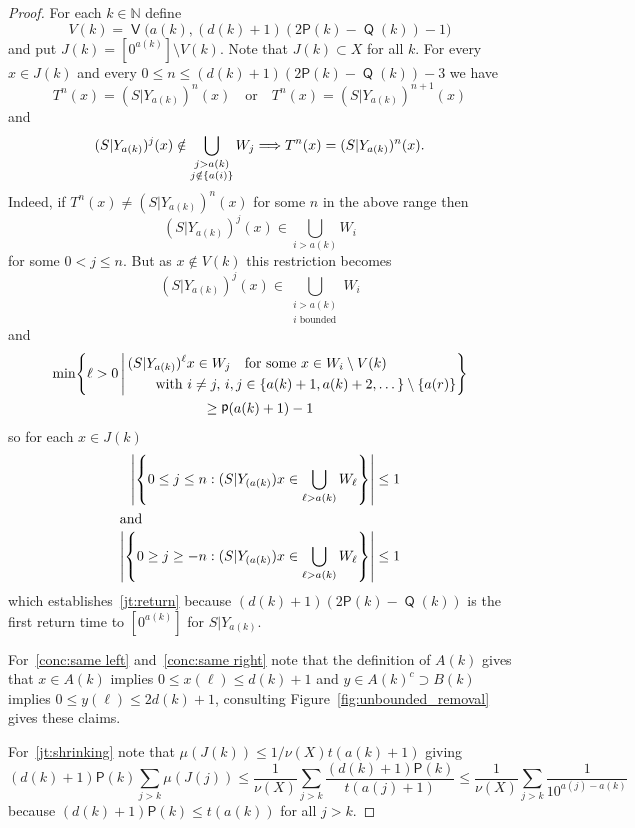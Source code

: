 \documentclass[AHL,Unicode,longabstracts,published]{cedram}
\DeclareMathOperator{\bad}{\mathsf{V}}
\DeclareMathOperator{\p}{\mathsf{p}}
\DeclareMathOperator{\Q}{\mathsf{Q}}
\newcommand{\N}{\mathbb{N}}
\renewcommand{\P}{\mathsf{P}}
\let\originalleft\left
\let\originalright\right
\renewcommand{\left}{\mathopen{}\mathclose\bgroup\originalleft}
\renewcommand{\right}{\aftergroup\egroup\originalright}
\renewcommand*{\implies}{\mathchoice{\Longrightarrow}{\Rightarrow}{\Rightarrow}{\Rightarrow}}
\begin{document}
\begin{proof}
For each $k \in \N$ define
\[
V(k) = \bad \bigl(a(k),(d(k)+1)(2\P(k)-\Q(k))-1\bigr)
\]
and put $J(k) = [0^{a(k)}] \setminus V(k)$. Note that $J(k) \subset X$ for all $k$. For every $x \in J(k)$ and every $0 \le n \le (d(k)+1)(2\P(k)-\Q(k))-3$ we have
\begin{equation}\label{eqn:tower_discrep}
T^n(x) = (S|Y_{a(k)})^n(x) \quad\text{or}\quad T^n(x) = (S|Y_{a(k)})^{n+1}(x)
\end{equation}
and
\begin{equation}\label{eq:equal}
(S|Y_{a(k)})^j(x) \notin \bigcup_{\substack{j>a(k)\\j \notin\{a(i)\}}}W_j
\implies T^n(x)=(S|Y_{a(k)})^n(x).
\end{equation}
Indeed, if $T^n(x) \ne (S|Y_{a(k)})^n(x)$ for some $n$ in the above range then
\[
(S|Y_{a(k)})^j(x) \in \bigcup_{i>a(k)}W_i
\]
for some $0 < j \le n$. But as $x \notin V(k)$ this restriction becomes
\[
(S|Y_{a(k)})^j(x) \in \bigcup_{\substack{i>a(k)\\i \text{ bounded}}} W_i
\]
and
\begin{multline*}
\min
\left\{
\ell>0 \,\middle|\,
\begin{aligned}
&(S|Y_{a(k)})^\ell x \in W_j\quad \text{for some } x \in W_i \setminus V(k)\\
&\qquad\text{with }i\neq j, \, i,j\in \{a(k)+1,a(k)+2,\dots\}\setminus \{a(r)\}
\end{aligned}
\right\}\\
\ge \p(a(k)+1)-1
\end{multline*}
so for each $x \in J(k)$
\begin{align*}
\left|
\left\{ 0\leq j\leq n:(S|Y_{(a(k)})x \in \bigcup_{\ell>a(k)}W_\ell \right\} \right|
&\leq 1\\
\intertext{and}
\left| \left\{ 0\geq j\geq -n:(S|Y_{(a(k)})x \in \bigcup_{\ell>a(k)}W_\ell \right\} \right| &\leq 1
\end{align*}
which establishes~\eqref{jt:return} because $(d(k)+1)(2\P(k)-\Q(k))$ is the first return time to $[0^{a(k)}]$ for $S|Y_{a(k)}$.

For~\eqref{conc:same left} and~\eqref{conc:same right} note that the definition of $A(k)$ gives that $x \in A(k)$ implies $0\leq x(\ell)\leq d(k)+1$ and $y \in A(k)^c\supset B(k)$ implies $0\leq y(\ell)\leq 2d(k)+1$, consulting Figure~\ref{fig:unbounded_removal} gives these claims.

For~\eqref{jt:shrinking} note that $\mu(J(k)) \le 1/\nu(X) t(a(k)+1)$ giving
\begin{equation}\label{eq:est JT}
(d(k)+1)\P(k) \sum_{j > k} \mu(J(j))
\le
\frac{1}{\nu(X)} \sum_{j > k} \frac{(d(k)+1)\P(k)}{t(a(j)+1)}
\le
\frac{1}{\nu(X)} \sum_{j > k} \frac{1}{10^{a(j) - a(k)}}
\end{equation}
because $(d(k)+1)\P(k) \le t(a(k))$ for all $j > k$.


\end{proof}
\end{document}
